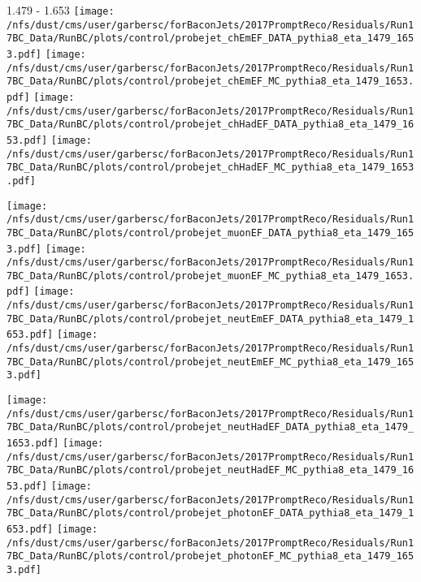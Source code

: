 \documentclass[t,compress]{beamer}
\begin{document}
\begin{frame}{1.479 - 1.653}
	\texttt{[image: /nfs/dust/cms/user/garbersc/forBaconJets/2017PromptReco/Residuals/Run17BC\_Data/RunBC/plots/control/probejet\_chEmEF\_DATA\_pythia8\_eta\_1479\_1653.pdf]}
	\texttt{[image: /nfs/dust/cms/user/garbersc/forBaconJets/2017PromptReco/Residuals/Run17BC\_Data/RunBC/plots/control/probejet\_chEmEF\_MC\_pythia8\_eta\_1479\_1653.pdf]}
	\texttt{[image: /nfs/dust/cms/user/garbersc/forBaconJets/2017PromptReco/Residuals/Run17BC\_Data/RunBC/plots/control/probejet\_chHadEF\_DATA\_pythia8\_eta\_1479\_1653.pdf]}
	\texttt{[image: /nfs/dust/cms/user/garbersc/forBaconJets/2017PromptReco/Residuals/Run17BC\_Data/RunBC/plots/control/probejet\_chHadEF\_MC\_pythia8\_eta\_1479\_1653.pdf]}
\newline

\vspace{-0.65cm}
	\texttt{[image: /nfs/dust/cms/user/garbersc/forBaconJets/2017PromptReco/Residuals/Run17BC\_Data/RunBC/plots/control/probejet\_muonEF\_DATA\_pythia8\_eta\_1479\_1653.pdf]}
	\texttt{[image: /nfs/dust/cms/user/garbersc/forBaconJets/2017PromptReco/Residuals/Run17BC\_Data/RunBC/plots/control/probejet\_muonEF\_MC\_pythia8\_eta\_1479\_1653.pdf]}
	\texttt{[image: /nfs/dust/cms/user/garbersc/forBaconJets/2017PromptReco/Residuals/Run17BC\_Data/RunBC/plots/control/probejet\_neutEmEF\_DATA\_pythia8\_eta\_1479\_1653.pdf]}
	\texttt{[image: /nfs/dust/cms/user/garbersc/forBaconJets/2017PromptReco/Residuals/Run17BC\_Data/RunBC/plots/control/probejet\_neutEmEF\_MC\_pythia8\_eta\_1479\_1653.pdf]}
\newline

\vspace{-0.65cm}
	\texttt{[image: /nfs/dust/cms/user/garbersc/forBaconJets/2017PromptReco/Residuals/Run17BC\_Data/RunBC/plots/control/probejet\_neutHadEF\_DATA\_pythia8\_eta\_1479\_1653.pdf]}
	\texttt{[image: /nfs/dust/cms/user/garbersc/forBaconJets/2017PromptReco/Residuals/Run17BC\_Data/RunBC/plots/control/probejet\_neutHadEF\_MC\_pythia8\_eta\_1479\_1653.pdf]}
	\texttt{[image: /nfs/dust/cms/user/garbersc/forBaconJets/2017PromptReco/Residuals/Run17BC\_Data/RunBC/plots/control/probejet\_photonEF\_DATA\_pythia8\_eta\_1479\_1653.pdf]}
	\texttt{[image: /nfs/dust/cms/user/garbersc/forBaconJets/2017PromptReco/Residuals/Run17BC\_Data/RunBC/plots/control/probejet\_photonEF\_MC\_pythia8\_eta\_1479\_1653.pdf]}
\end{frame}
\end{document}
